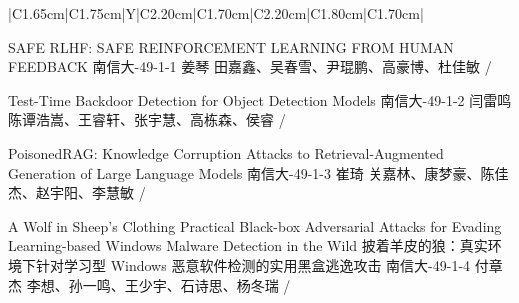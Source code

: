 \Needspace{7.5cm}
\begin{tabularx}{\textwidth}{|C{1.65cm}|C{1.75cm}|Y|C{2.20cm}|C{1.70cm}|C{2.20cm}|C{1.80cm}|C{1.70cm}|}
\HeaderRow

{SAFE RLHF: SAFE REINFORCEMENT LEARNING FROM HUMAN FEEDBACK\newline }
{南信大-49-1-1}
{姜琴}
{田嘉鑫、吴春雪、尹琨鹏、高豪博、杜佳敏}
{}{/}

{Test-Time Backdoor Detection for Object Detection Models\newline }
{南信大-49-1-2}
{闫雷鸣}
{陈谭浩嵩、王睿轩、张宇慧、高栋森、侯睿}
{}{/}


{PoisonedRAG: Knowledge Corruption Attacks to Retrieval-Augmented Generation of Large Language Models\newline }
{南信大-49-1-3}
{崔琦}
{关嘉林、康梦豪、陈佳杰、赵宇阳、李慧敏}
{}{/}

{A Wolf in Sheep’s Clothing Practical Black-box Adversarial Attacks for Evading Learning-based Windows Malware Detection in the Wild \newline 披着羊皮的狼：真实环境下针对学习型 Windows 恶意软件检测的实用黑盒逃逸攻击}
{南信大-49-1-4}
{付章杰}
{李想、孙一鸣、王少宇、石诗思、杨冬瑞}
{}{/}
\end{tabularx}
\BlockGap





